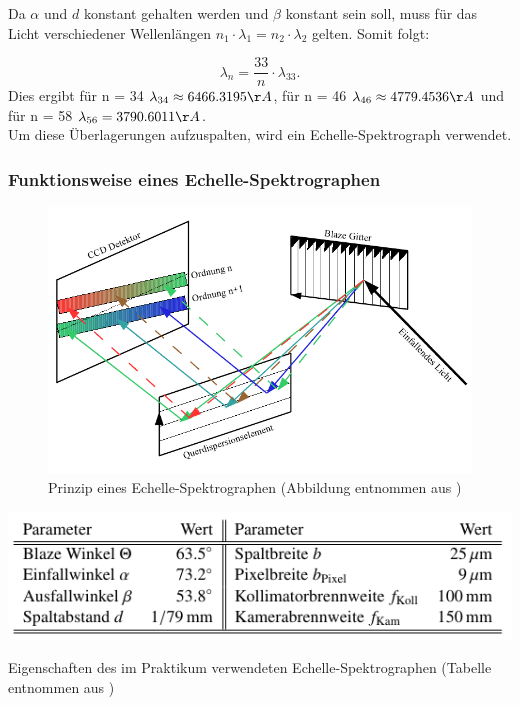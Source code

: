 Da $\alpha$ und $d$ konstant gehalten werden und $\beta$ konstant sein soll, muss für das Licht verschiedener Wellenlängen $n_1 \cdot \lambda_1 = n_2 \cdot \lambda_2$ gelten. Somit folgt: 

\begin{equation}
\lambda_n = \frac{33}{n} \cdot \lambda_{33}.
\end{equation}
Dies ergibt für n = 34 $\lambda_{34} \approx 6466.3195 \AA$, für n = 46 $\lambda_{46} \approx 4779.4536 \AA$ und für n = 58 $\lambda_{56} = 3790.6011 \AA$.\\

Um diese Überlagerungen aufzuspalten, wird ein Echelle-Spektrograph verwendet.

\subsubsection{Funktionsweise eines Echelle-Spektrographen}

\begin{figure}
		\includegraphics[width=.9\textwidth]{images/Abbildung104}
\caption{ Prinzip eines Echelle-Spektrographen (Abbildung entnommen aus \cite{ronomischesPraktikum})}
\label{fig:104}
\end{figure}

\begin{table}
		\includegraphics[width=.9\textwidth]{images/Tabelle101}
\caption{ Eigenschaften des im Praktikum verwendeten Echelle-Spektrographen (Tabelle entnommen aus \cite{ronomischesPraktikum})}
\label{tab:Echelle}
\end{table}

